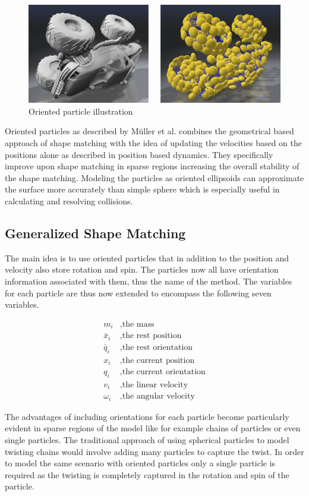 \begin{figure}[htb]
\centering
\includegraphics[width=.8\textwidth]{images/oriented_particles_illustration.png}
\caption{Oriented particle illustration}
\label{img:oriented_particles_illustration}
\end{figure}

Oriented particles as described by M{\"u}ller et al. \cite{Muller:2011gn} combines the geometrical based approach of shape matching with the idea of updating the velocities based on the positions alone as described in position based dynamics. They specifically improve upon shape matching in sparse regions increasing the overall stability of the shape matching. Modeling the particles as oriented ellipsoids can approximate the surface more accurately than simple sphere which is especially useful in calculating and resolving collisions.

\subsection{Generalized Shape Matching}
The main idea is to use oriented particles that in addition to the position and velocity also store rotation and spin. The particles now all have orientation information associated with them, thus the name of the method. The variables for each particle are thus now extended to encompass the following seven variables.

\begin{align*}
m_i &, \text{the mass} \\
\bar{x}_i &, \text{the rest position} \\
\bar{q}_i &, \text{the rest orientation} \\
x_i &, \text{the current position} \\
q_i &, \text{the current orientation} \\
v_i &, \text{the linear velocity} \\
\omega_i &, \text{the angular velocity}
\end{align*}

The advantages of including orientations for each particle become particularly evident in sparse regions of the model like for example chains of particles or even single particles. The traditional approach of using spherical particles to model twisting chains would involve adding many particles to capture the twist. In order to model the same scenario with oriented particles only a single particle is required as the twisting is completely captured in the rotation and spin of the particle.

